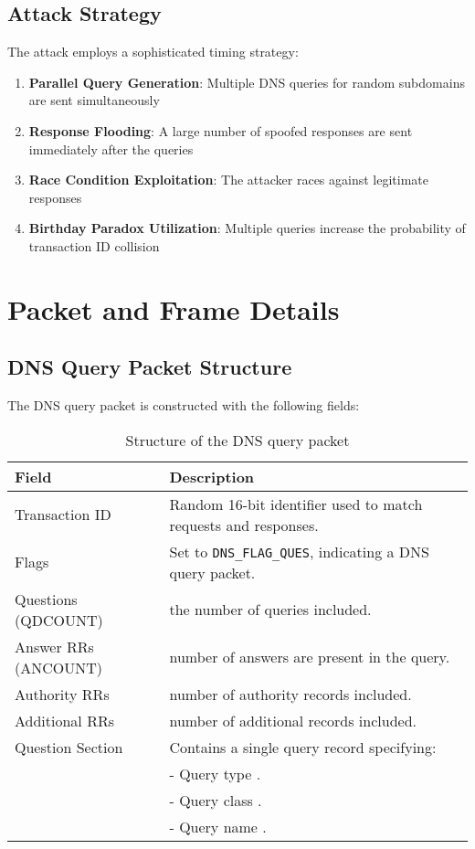 \documentclass[12pt,a4paper]{article}
\begin{document}
\subsection{Attack Strategy}

The attack employs a sophisticated timing strategy:

\begin{enumerate}
    \item \textbf{Parallel Query Generation}: Multiple DNS queries for random subdomains are sent simultaneously
    \item \textbf{Response Flooding}: A large number of spoofed responses are sent immediately after the queries
    \item \textbf{Race Condition Exploitation}: The attacker races against legitimate responses
    \item \textbf{Birthday Paradox Utilization}: Multiple queries increase the probability of transaction ID collision
\end{enumerate}

\section{Packet and Frame Details}

\subsection{DNS Query Packet Structure}

The DNS query packet is constructed with the following fields\cite{cert-dns}:

\begin{table}[H]
\centering
\begin{tabular}{|l|p{8cm}|}
\hline
\textbf{Field} & \textbf{Description} \\
\hline
Transaction ID & Random 16-bit identifier  used to match requests and responses. \\
\hline
Flags & Set to \texttt{DNS\_FLAG\_QUES}, indicating a DNS query packet. \\
\hline
Questions (QDCOUNT) &  the number of queries included. \\
\hline
Answer RRs (ANCOUNT) &  number of answers are present in the query. \\
\hline
Authority RRs & number of authority records included. \\
\hline
Additional RRs & number of  additional records included. \\
\hline
Question Section & Contains a single query record specifying: \\
& \quad - Query type . \\
& \quad - Query class . \\
& \quad - Query name . \\
\hline
\end{tabular}
\caption{Structure of the DNS query packet}
\end{table}
\end{document}
